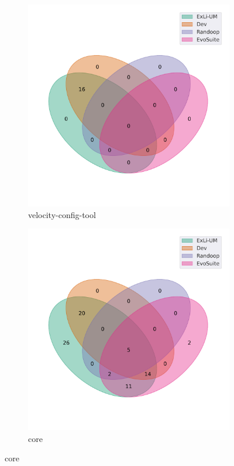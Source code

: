 \begin{figure}[t]\ContinuedFloat
\begin{subfigure}[b]{0.45\textwidth}
\includegraphics[width=\textwidth]{figures/venn/Bernardo-MG_velocity-config-tool-venn.pdf}
\vspace{-10pt}
\caption{velocity-config-tool}
\label{fig:venn-Bernardo-MG_velocity-config-tool}
\end{subfigure}
\hfill
\begin{subfigure}[b]{0.45\textwidth}
\includegraphics[width=\textwidth]{figures/venn/craftercms_core-venn.pdf}
\vspace{-10pt}
\caption{core}
\label{fig:venn-craftercms_core}
\end{subfigure}
\end{figure}
